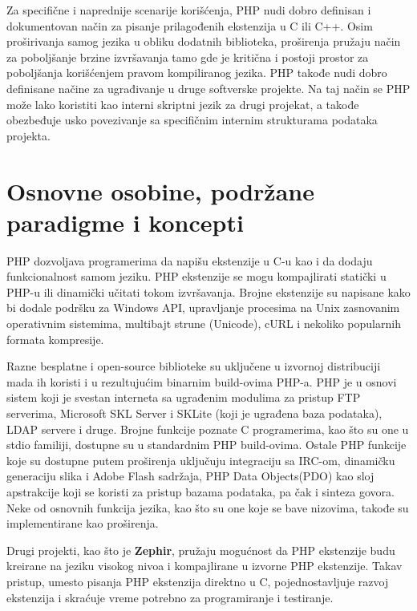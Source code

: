 \documentclass[a4paper]{article}
\begin{document}
{Za specifične i naprednije scenarije korišćenja, PHP nudi dobro definisan i dokumentovan način za pisanje prilagođenih ekstenzija u C ili C++. Osim proširivanja samog jezika u obliku dodatnih biblioteka, proširenja pružaju način za poboljšanje brzine izvršavanja tamo gde  je kritična i postoji prostor za poboljšanja korišćenjem pravom kompiliranog jezika. PHP takođe nudi dobro definisane načine za ugrađivanje u druge softverske projekte. Na taj način se PHP može lako koristiti kao interni skriptni jezik za drugi projekat, a takođe obezbeđuje usko povezivanje sa specifičnim internim strukturama podataka projekta.

\section{Osnovne osobine, podržane paradigme i koncepti}
PHP dozvoljava programerima da napišu ekstenzije u C-u kao i da dodaju funkcionalnost samom jeziku. PHP ekstenzije se mogu kompajlirati statički u PHP-u ili dinamički učitati tokom izvršavanja. Brojne ekstenzije su napisane kako bi dodale podršku za Windows API, upravljanje procesima na Unix zasnovanim operativnim sistemima, multibajt strune (Unicode), cURL i nekoliko popularnih formata kompresije.

Razne besplatne i open-source biblioteke su uključene u izvornoj distribuciji mada ih koristi i u rezultujućim binarnim build-ovima PHP-a. PHP je u osnovi sistem koji je svestan interneta sa ugrađenim modulima za pristup FTP serverima, Microsoft SKL Server i SKLite (koji je ugrađena baza podataka), LDAP servere i druge. Brojne funkcije poznate C programerima, kao što su one u stdio familiji, dostupne su u standardnim PHP build-ovima. Ostale PHP funkcije koje su dostupne putem proširenja uključuju integraciju sa IRC-om, dinamičku generaciju slika i Adobe Flash sadržaja, PHP Data Objects(PDO) kao sloj apstrakcije koji se koristi za pristup bazama podataka, pa čak i sinteza govora. Neke od osnovnih funkcija jezika, kao što su one koje se bave nizovima, takođe su implementirane kao proširenja\cite{corePHP}.

Drugi projekti, kao što je \textbf{Zephir}\cite{zephir}, pružaju mogućnost da PHP ekstenzije budu kreirane na jeziku visokog nivoa i kompajlirane u izvorne PHP ekstenzije. Takav pristup, umesto pisanja PHP ekstenzija direktno u C, pojednostavljuje razvoj ekstenzija i skraćuje vreme potrebno za programiranje i testiranje. 

}
\end{document}
